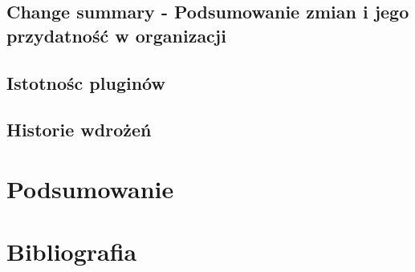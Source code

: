 \documentclass{article}
\begin{document}
	\subsection{Change summary - Podsumowanie zmian i  jego przydatność w organizacji}
	\subsection{Istotnośc pluginów}
	\subsection{Historie wdrożeń} %


\section{Podsumowanie}

\section{Bibliografia}
	
\end{document}
